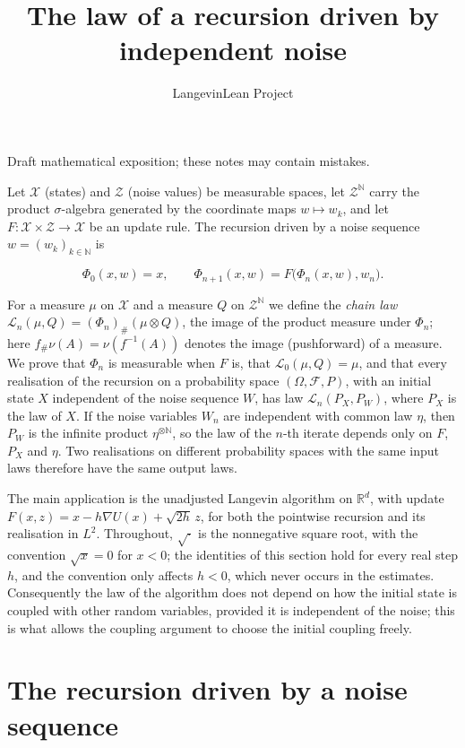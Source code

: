 \documentclass[11pt,a4paper]{article}
\title{\texorpdfstring{The law of a recursion driven by independent noise}{The law of a recursion driven by independent noise}}
\author{LangevinLean Project}
\date{}
\begin{document}
\maketitle
Draft mathematical exposition; these notes may contain mistakes.


Let \(\mathcal X\) (states) and \(\mathcal Z\) (noise values) be measurable spaces, let \(\mathcal Z^{\mathbb N}\) carry the product \(\sigma\)-algebra generated by the coordinate maps \(w\mapsto w_k\), and let \(F:\mathcal X\times\mathcal Z\to\mathcal X\) be an update rule. The recursion driven by a noise sequence \(w=(w_k)_{k\in\mathbb N}\) is


\[\Phi_0(x,w)=x,\qquad\Phi_{n+1}(x,w)=F\bigl(\Phi_n(x,w),w_n\bigr).\]


For a measure \(\mu\) on \(\mathcal X\) and a measure \(Q\) on \(\mathcal Z^{\mathbb N}\) we define the \emph{chain law} \(\mathcal L_n(\mu,Q)=(\Phi_n)_\#(\mu\otimes Q)\), the image of the product measure under \(\Phi_n\); here \(f_\#\nu(A)=\nu(f^{-1}(A))\) denotes the image (pushforward) of a measure. We prove that \(\Phi_n\) is measurable when \(F\) is, that \(\mathcal L_0(\mu,Q)=\mu\), and that every realisation of the recursion on a probability space \((\Omega,\mathcal F,P)\), with an initial state \(X\) independent of the noise sequence \(W\), has law \(\mathcal L_n(P_X,P_W)\), where \(P_X\) is the law of \(X\). If the noise variables \(W_n\) are independent with common law \(\eta\), then \(P_W\) is the infinite product \(\eta^{\otimes\mathbb N}\), so the law of the \(n\)-th iterate depends only on \(F\), \(P_X\) and \(\eta\). Two realisations on different probability spaces with the same input laws therefore have the same output laws.




The main application is the unadjusted Langevin algorithm on \(\mathbb R^d\), with update \(F(x,z)=x-h\nabla U(x)+\sqrt{2h}\,z\), for both the pointwise recursion and its realisation in \(L^2\). Throughout, \(\sqrt{\cdot}\) is the nonnegative square root, with the convention \(\sqrt x=0\) for \(x<0\); the identities of this section hold for every real step \(h\), and the convention only affects \(h<0\), which never occurs in the estimates. Consequently the law of the algorithm does not depend on how the initial state is coupled with other random variables, provided it is independent of the noise; this is what allows the coupling argument to choose the initial coupling freely.


\section{\texorpdfstring{The recursion driven by a noise sequence}{The recursion driven by a noise sequence}}
\end{document}
